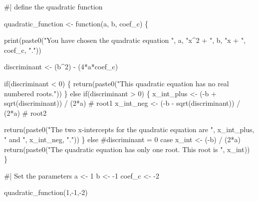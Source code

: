 \documentclass[
  letterpaper,
  DIV=11,
  numbers=noendperiod]{scrartcl}
\newenvironment{Shaded}{\begin{snugshade}}{\end{snugshade}}
\newcommand{\CommentTok}[1]{\textcolor[rgb]{0.37,0.37,0.37}{#1}}
\newcommand{\ControlFlowTok}[1]{\textcolor[rgb]{0.00,0.23,0.31}{#1}}
\newcommand{\DecValTok}[1]{\textcolor[rgb]{0.68,0.00,0.00}{#1}}
\newcommand{\FunctionTok}[1]{\textcolor[rgb]{0.28,0.35,0.67}{#1}}
\newcommand{\NormalTok}[1]{\textcolor[rgb]{0.00,0.23,0.31}{#1}}
\newcommand{\OtherTok}[1]{\textcolor[rgb]{0.00,0.23,0.31}{#1}}
\newcommand{\SpecialCharTok}[1]{\textcolor[rgb]{0.37,0.37,0.37}{#1}}
\newcommand{\StringTok}[1]{\textcolor[rgb]{0.13,0.47,0.30}{#1}}
\begin{document}
\begin{Shaded}
\begin{Highlighting}[]
\CommentTok{\#| define the quadratic function}

\NormalTok{quadratic\_function }\OtherTok{\textless{}{-}} \ControlFlowTok{function}\NormalTok{(a, b, coef\_c) \{}

  \FunctionTok{print}\NormalTok{(}\FunctionTok{paste0}\NormalTok{(}\StringTok{"You have chosen the quadratic equation "}\NormalTok{, a, }\StringTok{"x\^{}2 + "}\NormalTok{, b, }\StringTok{"x + "}\NormalTok{, coef\_c, }\StringTok{"."}\NormalTok{))}

\NormalTok{  discriminant }\OtherTok{\textless{}{-}}\NormalTok{ (b}\SpecialCharTok{\^{}}\DecValTok{2}\NormalTok{) }\SpecialCharTok{{-}}\NormalTok{ (}\DecValTok{4}\SpecialCharTok{*}\NormalTok{a}\SpecialCharTok{*}\NormalTok{coef\_c)}

  \ControlFlowTok{if}\NormalTok{(discriminant }\SpecialCharTok{\textless{}} \DecValTok{0}\NormalTok{) \{}
    \FunctionTok{return}\NormalTok{(}\FunctionTok{paste0}\NormalTok{(}\StringTok{"This quadratic equation has no real numbered roots."}\NormalTok{))}
\NormalTok{  \}}
  \ControlFlowTok{else} \ControlFlowTok{if}\NormalTok{(discriminant }\SpecialCharTok{\textgreater{}} \DecValTok{0}\NormalTok{) \{}
\NormalTok{    x\_int\_plus }\OtherTok{\textless{}{-}}\NormalTok{ (}\SpecialCharTok{{-}}\NormalTok{b }\SpecialCharTok{+} \FunctionTok{sqrt}\NormalTok{(discriminant)) }\SpecialCharTok{/}\NormalTok{ (}\DecValTok{2}\SpecialCharTok{*}\NormalTok{a) }\CommentTok{\# root1}
\NormalTok{    x\_int\_neg }\OtherTok{\textless{}{-}}\NormalTok{ (}\SpecialCharTok{{-}}\NormalTok{b }\SpecialCharTok{{-}} \FunctionTok{sqrt}\NormalTok{(discriminant)) }\SpecialCharTok{/}\NormalTok{ (}\DecValTok{2}\SpecialCharTok{*}\NormalTok{a) }\CommentTok{\# root2}

    \FunctionTok{return}\NormalTok{(}\FunctionTok{paste0}\NormalTok{(}\StringTok{"The two x{-}intercepts for the quadratic equation are "}\NormalTok{,}
\NormalTok{                  x\_int\_plus, }\StringTok{" and "}\NormalTok{, x\_int\_neg, }\StringTok{"."}\NormalTok{))}
\NormalTok{  \}}
  \ControlFlowTok{else} \CommentTok{\#discriminant = 0  case}
\NormalTok{    x\_int }\OtherTok{\textless{}{-}}\NormalTok{ (}\SpecialCharTok{{-}}\NormalTok{b) }\SpecialCharTok{/}\NormalTok{ (}\DecValTok{2}\SpecialCharTok{*}\NormalTok{a)}
    \FunctionTok{return}\NormalTok{(}\FunctionTok{paste0}\NormalTok{(}\StringTok{"The quadratic equation has only one root. This root is "}\NormalTok{,}
\NormalTok{                  x\_int))}
\NormalTok{\}}


\CommentTok{\#| Set the parameters}
\NormalTok{a }\OtherTok{\textless{}{-}} \DecValTok{1}
\NormalTok{b }\OtherTok{\textless{}{-}} \SpecialCharTok{{-}}\DecValTok{1}
\NormalTok{coef\_c }\OtherTok{\textless{}{-}} \SpecialCharTok{{-}}\DecValTok{2}


\FunctionTok{quadratic\_function}\NormalTok{(}\DecValTok{1}\NormalTok{,}\SpecialCharTok{{-}}\DecValTok{1}\NormalTok{,}\SpecialCharTok{{-}}\DecValTok{2}\NormalTok{)}
\end{Highlighting}
\end{Shaded}
\end{document}

